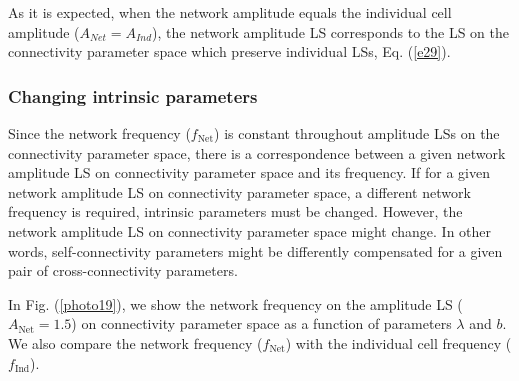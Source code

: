 As it is expected, when the network amplitude equals the individual cell amplitude ($A_{Net} = A_{Ind}$), the network amplitude LS corresponds to the LS on the connectivity parameter space which preserve individual LSs, Eq. (\ref{e29}).

\subsubsection{Changing intrinsic parameters}
Since the network frequency ($f_{\text{Net}}$) is constant throughout amplitude LSs on the connectivity parameter space, there is a correspondence between a given network amplitude LS on connectivity parameter space and its frequency. If for a given network amplitude LS on connectivity parameter space, a different network frequency is required, intrinsic parameters must be changed. However, the network amplitude LS on connectivity parameter space might change. In other words, self-connectivity parameters might be differently compensated for a given pair of cross-connectivity parameters.

In Fig. (\ref{photo19}), we show the network frequency on the amplitude LS ($A_{\text{Net}} = 1.5$) on connectivity parameter space as a function of parameters $\lambda$ and $b$. We also compare the network frequency ($f_{\text{Net}}$) with the individual cell frequency ($f_{\text{Ind}}$).


